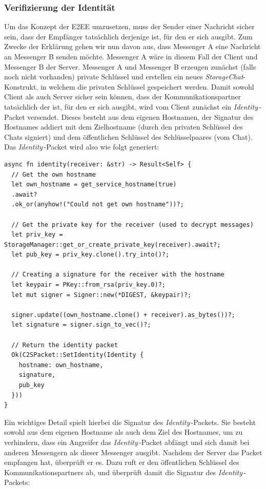 \documentclass[a4paper,ngerman, headheight=28pt,12pt]{scrartcl}
\newcommand{\identity}{\textit{Identity\,}}
\begin{document}
\subsubsection{Verifizierung der Identität}
Um das Konzept der E2EE umzusetzen, muss der Sender einer Nachricht sicher sein, dass der Empfänger tatsächlich derjenige ist, für den er sich ausgibt. Zum Zwecke der Erklärung gehen wir nun davon aus, dass Messenger A eine Nachricht an Messenger B senden möchte. Messenger A wäre in diesem Fall der Client und Messenger B der Server.
Messenger A und Messenger B erzeugen zunächst (falls noch nicht vorhanden) private Schlüssel und erstellen ein neues \textit{StorageChat}-Konstrukt, in welchem die privaten Schlüssel gespeichert werden.
Damit sowohl Client als auch Server sicher sein können, dass der Kommunikationspartner tatsächlich der ist, für den er sich ausgibt, wird vom Client zunächst ein \identity-Packet versendet.
Dieses besteht aus dem eigenen Hostnamen, der Signatur des Hostnames addiert mit dem Zielhostname (durch den privaten Schlüssel des Chats signiert) und dem öffentlichen Schlüssel des Schlüsselpaares (vom Chat). Das \identity-Packet wird also wie folgt generiert:
\begin{verbatim}
async fn identity(receiver: &str) -> Result<Self> {
  // Get the own hostname
  let own_hostname = get_service_hostname(true)
  .await?
  .ok_or(anyhow!("Could not get own hostname"))?;

  // Get the private key for the receiver (used to decrypt messages)
  let priv_key = StorageManager::get_or_create_private_key(receiver).await?;
  let pub_key = priv_key.clone().try_into()?;

  // Creating a signature for the receiver with the hostname
  let keypair = PKey::from_rsa(priv_key.0)?;
  let mut signer = Signer::new(*DIGEST, &keypair)?;

  signer.update((own_hostname.clone() + receiver).as_bytes())?;
  let signature = signer.sign_to_vec()?;

  // Return the identity packet
  Ok(C2SPacket::SetIdentity(Identity {
    hostname: own_hostname,
    signature,
    pub_key
  }))
}
\end{verbatim}
Ein wichtiges Detail spielt hierbei die Signatur des \identity-Packets. Sie besteht sowohl aus dem eigenen Hostname als auch dem Ziel des Hostnames, um zu verhindern, dass ein Angreifer das \identity-Packet abfängt und sich damit bei anderen Messengern als dieser Messenger ausgibt.
Nachdem der Server das Packet empfangen hat, überprüft er es. Dazu ruft er den öffentlichen Schlüssel des Kommunikationspartners ab, und überprüft damit die Signatur des \identity-Packets:
\end{document}
